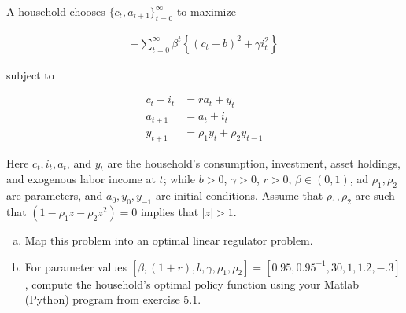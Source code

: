 
\begin{homeworkProblem}[Problem 5.3]

  A household chooses $\{c_t, a _{t+1}\}_{t=0}^{\infty}$ to maximize

  \begin{align} \label{eq:p3e1}
    - \sum_{t=0}^{\infty} \beta^t \left\{ (c_t - b)^2 + \gamma i_t^2 \right \}
  \end{align}

  subject to

  \begin{align} \label{eq:p3e2}
    c_t + i_t &= r a_t + y_t \\
    a_{t+1}   &= a_t + i_t \\
    y _{t+1} &= \rho_1 y_t + \rho_2 y_{t-1}
  \end{align}

  Here $c_t, i_t, a_t$, and $ y_t$ are the household's consumption, investment, asset holdings, and exogenous labor income at $t$; while $b > 0$, $\gamma > 0$, $ r > 0$, $\beta \in (0, 1)$, ad $\rho_1,  \rho_2$ are parameters, and $a_0, y_0, y_{-1}$ are initial conditions. Assume that $\rho_1, \rho_2$ are such that $\left(1 - \rho_1 z - \rho_2 z^2 \right) =0$ implies that $|z| > 1$.

  \begin{enumerate}[a.]
    \item Map this problem into an optimal linear regulator problem.
    \item For parameter values $\left[ \beta, (1+ r), b, \gamma, \rho_1, \rho_2\right] = \left[0.95, 0.95 ^{-1}, 30, 1, 1.2, -.3 \right]$, compute the household's optimal policy function using your Matlab (Python) program from exercise 5.1.
  \end{enumerate}


  \vspace{.2in}

\end{homeworkProblem}
